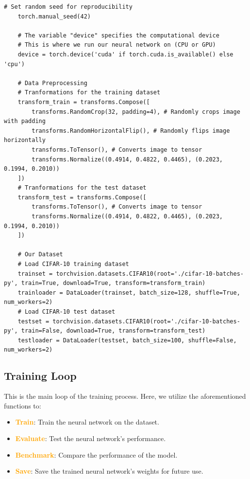 \begin{lstlisting}[caption={Data Preparation}, label={lst:data_prep}]
    # Set random seed for reproducibility
    torch.manual_seed(42)

    # The variable "device" specifies the computational device 
    # This is where we run our neural network on (CPU or GPU)
    device = torch.device('cuda' if torch.cuda.is_available() else 'cpu')

    # Data Preprocessing 
    # Tranformations for the training dataset
    transform_train = transforms.Compose([
        transforms.RandomCrop(32, padding=4), # Randomly crops image with padding
        transforms.RandomHorizontalFlip(), # Randomly flips image horizontally
        transforms.ToTensor(), # Converts image to tensor
        transforms.Normalize((0.4914, 0.4822, 0.4465), (0.2023, 0.1994, 0.2010))
    ])
    # Tranformations for the test dataset
    transform_test = transforms.Compose([
        transforms.ToTensor(), # Converts image to tensor
        transforms.Normalize((0.4914, 0.4822, 0.4465), (0.2023, 0.1994, 0.2010))
    ])

    # Our Dataset
    # Load CIFAR-10 training dataset
    trainset = torchvision.datasets.CIFAR10(root='./cifar-10-batches-py', train=True, download=True, transform=transform_train)
    trainloader = DataLoader(trainset, batch_size=128, shuffle=True, num_workers=2)
    # Load CIFAR-10 test dataset
    testset = torchvision.datasets.CIFAR10(root='./cifar-10-batches-py', train=False, download=True, transform=transform_test)
    testloader = DataLoader(testset, batch_size=100, shuffle=False, num_workers=2)
\end{lstlisting}

\subsection{Training Loop}
This is the main loop of the training process. Here, we utilize the aforementioned functions to:
\begin{itemize}
    \item \textcolor{orange}{\textbf{Train}}: Train the neural network on the dataset.
    \item \textcolor{orange}{\textbf{Evaluate}}: Test the neural network's performance.
    \item \textcolor{orange}{\textbf{Benchmark}}: Compare the performance of the model.
    \item \textcolor{orange}{\textbf{Save}}: Save the trained neural network's weights for future use.
\end{itemize}

